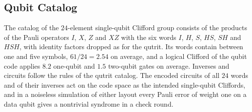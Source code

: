 \subsection{Qubit Catalog}
\label{app:catalog-qubit}

The catalog of the $24$-element single-qubit Clifford group consists of the products of the Pauli operators $I$, $X$, $Z$ and $XZ$ with the six words $I$, $H$, $S$, $HS$, $SH$ and $HSH$, with identity factors dropped as for the qutrit. Its words contain between one and five symbols, $61/24 = 2.54$ on average, and a logical Clifford of the qubit code applies $8.2$ one-qubit and $1.5$ two-qubit gates on average. Inverses and circuits follow the rules of the qutrit catalog. The encoded circuits of all $24$ words and of their inverses act on the code space as the intended single-qubit Cliffords, and in a noiseless simulation of either layout every Pauli error of weight one on a data qubit gives a nontrivial syndrome in a check round.
